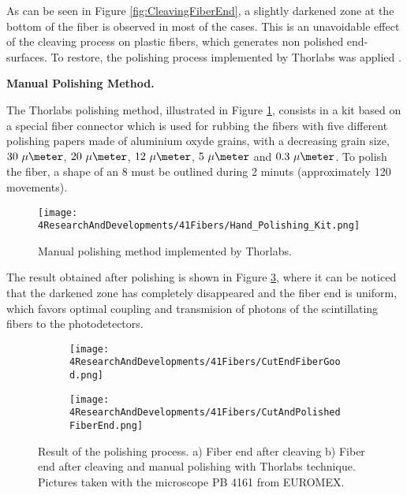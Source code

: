 As can be seen in Figure \ref{fig:CleavingFiberEnd}, a slightly darkened zone at the bottom of the fiber is observed in most of the cases. This is an unavoidable effect of the cleaving process on plastic fibers, which generates non polished end-surfaces. To restore, the polishing process implemented by Thorlabs was applied \cite{DiamondThorlabs}. 

\textbf{Manual Polishing Method.}

The Thorlabs polishing method, illustrated in Figure \ref{fig:HandPolishingMethod}, consists in a kit based on a special fiber connector which is used for rubbing the fibers with five different polishing papers made of aluminium  oxyde grains, with a decreasing grain size, $30~\mu\meter$, $20~\mu\meter$, $12~\mu\meter$, $5~\mu\meter$ and $0.3~\mu\meter$. To polish the fiber, a shape of an 8 must be outlined during 2 minuts (approximately 120 movements). 

\begin{figure}[h]
\centering
\texttt{[image: 4ResearchAndDevelopments/41Fibers/Hand\_Polishing\_Kit.png]}
\caption{Manual polishing method implemented by Thorlabs.\label{fig:HandPolishingMethod}}
\end{figure}
The result obtained after polishing is shown in Figure \ref{subfig:PolishFiberEnd}, where it can be noticed that the darkened zone has completely disappeared and the fiber end is uniform, which favors optimal coupling and transmision of photons of the scintillating fibers to the photodetectors.

\begin{figure}
\centering
    \begin{subfigure}[b]{0.5\textwidth}
    \centering
    \texttt{[image: 4ResearchAndDevelopments/41Fibers/CutEndFiberGood.png]}  
    \caption{\label{subfig:CleaveFiberEnd}}
    \end{subfigure}
    \hfill
    \begin{subfigure}[b]{0.45\textwidth}
    \centering
    \texttt{[image: 4ResearchAndDevelopments/41Fibers/CutAndPolishedFiberEnd.png]}  
    \caption{\label{subfig:PolishFiberEnd}}
    \end{subfigure}
 \caption{Result of the polishing process. a) Fiber end after cleaving b) Fiber end after cleaving and manual polishing with Thorlabs technique. Pictures taken with the microscope PB 4161 from EUROMEX.}
 \label{fig:ResultofPolishingProcess}
\end{figure}

